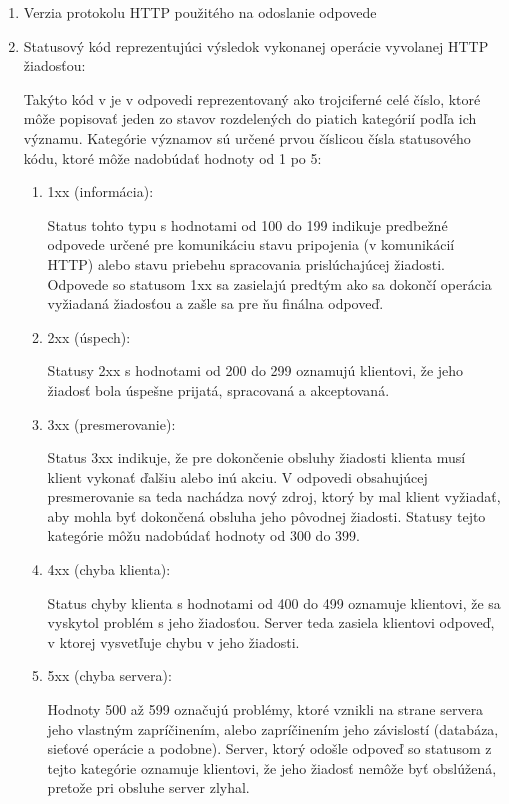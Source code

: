 \begin{enumerate}
    \item Verzia protokolu HTTP použitého na odoslanie odpovede

    \item Statusový kód reprezentujúci výsledok vykonanej operácie vyvolanej HTTP žiadosťou:

    Takýto kód v je v odpovedi reprezentovaný ako trojciferné celé číslo, ktoré môže popisovať jeden
    zo stavov rozdelených do piatich kategórií podľa ich významu. 
    Kategórie významov sú určené prvou číslicou čísla statusového kódu, ktoré môže nadobúdať hodnoty od 1 po 5:

    \begin{enumerate}
        \item 1xx (informácia):
        
        Status tohto typu s hodnotami od 100 do 199 indikuje predbežné odpovede určené pre komunikáciu stavu pripojenia (v komunikácií HTTP) alebo stavu priebehu spracovania prislúchajúcej žiadosti.
        Odpovede so statusom 1xx sa zasielajú predtým ako sa dokončí operácia vyžiadaná žiadosťou a zašle sa pre ňu finálna odpoveď.
        
        \item 2xx (úspech):
        
        Statusy 2xx s hodnotami od 200 do 299 oznamujú klientovi, že jeho žiadosť bola úspešne prijatá, spracovaná a akceptovaná. 
        
        \item 3xx (presmerovanie):
        
        Status 3xx indikuje, že pre dokončenie obsluhy žiadosti klienta musí klient vykonať ďalšiu alebo inú akciu.
        V odpovedi obsahujúcej presmerovanie sa teda nachádza nový zdroj, ktorý by mal klient vyžiadať, aby mohla byť dokončená obsluha jeho pôvodnej žiadosti. 
        Statusy tejto kategórie môžu nadobúdať hodnoty od 300 do 399.
        
        \item 4xx (chyba klienta):

        Status chyby klienta s hodnotami od 400 do 499 oznamuje klientovi, že sa vyskytol problém s jeho žiadosťou.
        Server teda zasiela klientovi odpoveď, v ktorej vysvetľuje chybu v jeho žiadosti.
        
        \item 5xx (chyba servera):

        Hodnoty 500 až 599 označujú problémy, ktoré vznikli na strane servera jeho vlastným zapríčinením, alebo zapríčinením jeho závislostí (databáza, sieťové operácie a podobne).
        Server, ktorý odošle odpoveď so statusom z tejto kategórie oznamuje klientovi, že jeho žiadosť nemôže byť obslúžená, pretože pri obsluhe server zlyhal.
    \end{enumerate}


\end{enumerate}
